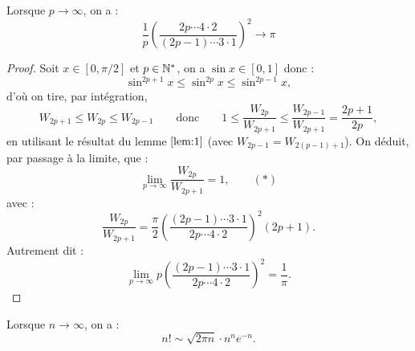 \begin{lem}
\label{lem:Wallis}
Lorsque $p \to \infty$, on a :
\[ \dfrac1{p} \left ( \dfrac{2p \cdots 4 \cdot 2}{(2p-1) \cdots 3 \cdot 1} \right )^2 \to \pi \]
\end{lem}

\begin{proof}
Soit $x \in [0, \pi/2]$ et $p \in \mathbb{N}^\ast$, on a $\sin{x} \in [0,1]$ donc :
\[ \sin^{2p+1}{x} \leq \sin^{2p}{x} \leq \sin^{2p-1}{x} , \]
d'où on tire, par intégration, 
\[ W_{2p+1} \leq W_{2p} \leq W_{2p-1} \qquad \text{donc} \qquad 1 \leq \dfrac{W_{2p}}{W_{2p+1}} \leq \dfrac{W_{2p-1}}{W_{2p+1}}
= \dfrac{2p+1}{2p} , \]
en utilisant le résultat du lemme $\ref{lem:1}$ (avec $W_{2p-1} = W_{2(p-1)+1}$). 
On déduit, par passage à la limite, que :
\[ \lim_{p \to \infty} \dfrac{W_{2p}}{W_{2p+1}} = 1 , \qquad (*) \]
avec :
\[ \dfrac{W_{2p}}{W_{2p+1}} = \dfrac{\pi}2 \left ( \dfrac{(2p-1) \cdots 3 \cdot 1}{2p \cdots 4 \cdot 2} \right )^2 (2p+1) . \]
Autrement dit :
\[ \lim_{p \to \infty} p \left ( \dfrac{(2p-1) \cdots 3 \cdot 1}{2p \cdots 4 \cdot 2} \right )^2 = \dfrac1{\pi} . \]
\end{proof}

\begin{thm}
Lorsque $n \to \infty$, on a :
\[ n! \sim \sqrt{2\pi n}\cdot n^ne^{-n} . \]
\end{thm}

